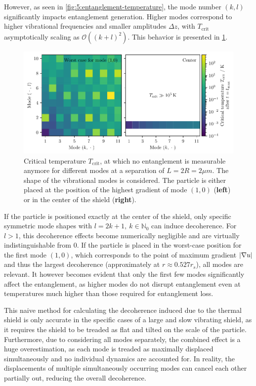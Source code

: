 However, as seen in \cref{fig:5:entanglement-temperature}, the mode number $(k, l)$ significantly impacts entanglement generation.
Higher modes correspond to higher vibrational frequencies and smaller amplitudes $\Delta z$, with $T_\mathrm{crit}$ asymptotically scaling as $\mathcal{O}((k + l)^2)$. 
This behavior is presented in \cref{fig:5:T-crit-modes}.
\begin{figure}[!htbp]
  \centering
  \includegraphics[width=\textwidth]{./../figures/vibrations/T-crit-modes.pdf}
  \caption{Critical temperature $T_\mathrm{crit}$, at which no entanglement is measurable anymore for different modes at a separation of $L = 2R = 2\si{\mu m}$. The shape of the vibrational modes is considered. The particle is either placed at the position of the highest gradient of mode $(1,0)$ (\textbf{left}) or in the center of the shield (\textbf{right}).}
  \label{fig:5:T-crit-modes}
\end{figure}
If the particle is positioned exactly at the center of the shield, only specific symmetric mode shapes with $l=2k+1,\ k\in\mathbb{N}_0$ can induce decoherence.
For $l > 1$, this decoherence effects become numerically negligible and are virtually indistinguishable from $0$.
If the particle is placed in the worst-case position for the first mode $(1,0)$, which corresponds to the point of maximum gradient $\left\lvert\nabla u\right\rvert$ and thus the largest decoherence (approximately at $r \approx 0.527 r_s$), all modes are relevant.
It however becomes evident that only the first few modes significantly affect the entanglement, as higher modes do not disrupt entanglement even at temperatures much higher than those required for entanglement loss.

This naive method for calculating the decoherence induced due to the thermal shield is only accurate in the specific cases of a large and slow vibrating shield, as it requires the shield to be treaded as flat and tilted on the scale of the particle.
Furthermore, due to considering all modes separately, the combined effect is a huge overestimation, as each mode is treaded as maximally displaced simultaneously and no individual dynamics are accounted for.
In reality, the displacements of multiple simultaneously occurring modes can cancel each other partially out, reducing the overall decoherence.


